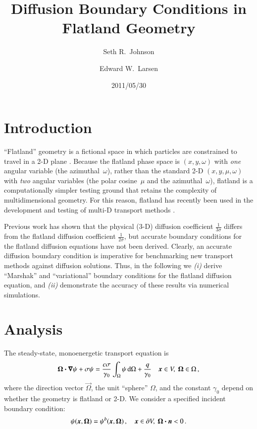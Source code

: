 \documentclass{anstrans}
\title{Diffusion Boundary Conditions in Flatland Geometry}
\author{Seth R.~Johnson \and Edward W.~Larsen}
\institute{Department of Nuclear Engineering \& Radiological Sciences, University of Michigan, Ann Arbor, MI, 48109}
\date{2011/05/30}
\begin{document}
\section{Introduction}
``Flatland'' geometry is a fictional space in which particles are constrained to
travel in a 2-D plane \cite{Asa2008}. Because the flatland phase space is
$(x,y,\omega)$ with \emph{one} angular variable (the azimuthal~$\omega$),
rather than the
standard 2-D $(x,y,\mu,\omega)$ with \emph{two} angular variables (the
polar cosine~$\mu$ and the azimuthal~$\omega$),
\mbox{flatland} is a computationally simpler testing ground that retains the
complexity of multidimensional geometry. For this reason, flatland has recently
been used in the development and testing of multi-D transport methods
\cite{Lar2009c,Joh2011,Tra2011}.

Previous work has shown that the physical (3-D) diffusion coefficient
$\frac{1}{3\sigma}$ differs from the flatland diffusion coefficient
$\frac{1}{2\sigma}$, but accurate boundary conditions for the flatland
diffusion equations have not been derived. Clearly, an accurate diffusion
boundary condition is imperative for benchmarking new transport methods against
diffusion solutions. Thus, in the following we \textsl{(i)} derive ``Marshak''
and ``variational'' boundary conditions for the flatland diffusion equation,
and \textsl{(ii)} demonstrate the accuracy of these results via numerical
simulations.

\section{Analysis}
The steady-state, monoenergetic transport equation is
\begin{equation}\label{eq:generalTransport}
  \bm{\Omega}\bm{\cdot} \bm{\nabla} \psi + \sigma \psi
  = \frac{c \sigma}{\gamma_0} \int_{\Omega} \psi \mathop{}\!\mathrm{d}\Omega + \frac{q}{\gamma_0}
  \quad \bm{x}\in V,\ \bm{\Omega}\in \Omega \,,
\end{equation}
where the direction vector $\vec{\Omega}$, the unit ``sphere'' $\Omega$, and
the constant $\gamma_0$ depend on whether the geometry
is flatland or 2-D. We consider a specified incident boundary condition:
\begin{equation} \label{eq:ssBndy}
  \psi(\bm{x}, \bm{\Omega}) = \psi^b(\bm{x}, \bm{\Omega})\,,
  \quad \bm{x}\in \partial V,\ \bm{\Omega} \bm{\cdot} \bm{n} < 0\,.
\end{equation}
\end{document}
